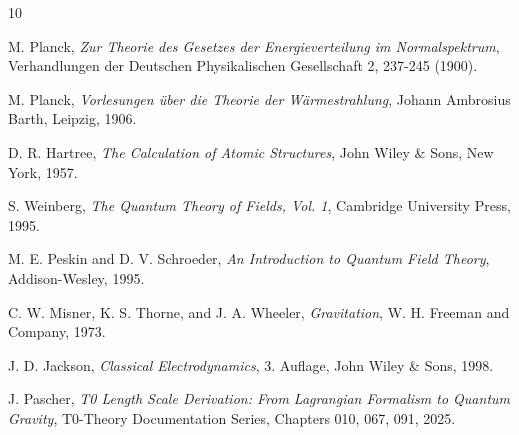 \begin{thebibliography}{10}
	
	M. Planck,
	\textit{Zur Theorie des Gesetzes der Energieverteilung im Normalspektrum},
	Verhandlungen der Deutschen Physikalischen Gesellschaft 2, 237-245 (1900).
	
	M. Planck,
	\textit{Vorlesungen über die Theorie der Wärmestrahlung},
	Johann Ambrosius Barth, Leipzig, 1906.
	
	D. R. Hartree,
	\textit{The Calculation of Atomic Structures},
	John Wiley \& Sons, New York, 1957.
	
	S. Weinberg,
	\textit{The Quantum Theory of Fields, Vol. 1},
	Cambridge University Press, 1995.
	
	M. E. Peskin and D. V. Schroeder,
	\textit{An Introduction to Quantum Field Theory},
	Addison-Wesley, 1995.
	
	C. W. Misner, K. S. Thorne, and J. A. Wheeler,
	\textit{Gravitation},
	W. H. Freeman and Company, 1973.
	
	J. D. Jackson,
	\textit{Classical Electrodynamics},
	3. Auflage, John Wiley \& Sons, 1998.
	
J. Pascher,
\textit{T0 Length Scale Derivation: From Lagrangian Formalism to Quantum Gravity},
T0-Theory Documentation Series, Chapters 010, 067, 091, 2025.
	
\end{thebibliography}	